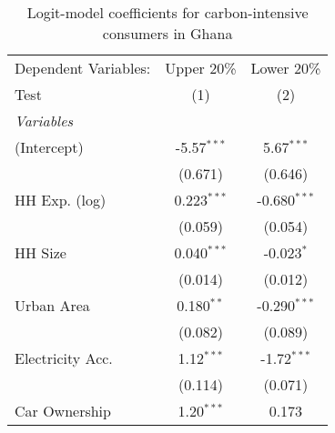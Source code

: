 
\begin{table}[htbp!]
   \centering
   \small
   \begin{adjustbox}{width = 1\textwidth, max height = 0.95\textheight, center}
      \begin{threeparttable}[b]
         \caption{\label{tab:Logit_1_GHA} Logit-model coefficients for carbon-intensive consumers in Ghana}
         \begin{tabular}{lcc}
            \tabularnewline \midrule \midrule
            Dependent Variables:                                                      & Upper 20\%    & Lower 20\%\\   
            Test                                                                      & (1)           & (2)\\  
            \midrule
            \emph{Variables}\\
            (Intercept)                                                               & -5.57$^{***}$ & 5.67$^{***}$\\   
                                                                                      & (0.671)       & (0.646)\\   
            HH Exp. (log)                                                             & 0.223$^{***}$ & -0.680$^{***}$\\   
                                                                                      & (0.059)       & (0.054)\\   
            HH Size                                                                   & 0.040$^{***}$ & -0.023$^{*}$\\   
                                                                                      & (0.014)       & (0.012)\\   
            Urban Area                                                                & 0.180$^{**}$  & -0.290$^{***}$\\   
                                                                                      & (0.082)       & (0.089)\\   
            Electricity Acc.                                                          & 1.12$^{***}$  & -1.72$^{***}$\\   
                                                                                      & (0.114)       & (0.071)\\   
            Car Ownership                                                             & 1.20$^{***}$  & 0.173\\   

\end{tabular}
\end{threeparttable}
\end{adjustbox}
\end{table}
